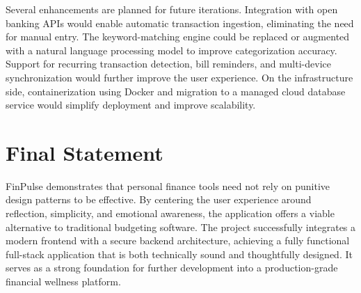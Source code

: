 Several enhancements are planned for future iterations. Integration with open banking APIs would enable automatic transaction ingestion, eliminating the need for manual entry. The keyword-matching engine could be replaced or augmented with a natural language processing model to improve categorization accuracy. Support for recurring transaction detection, bill reminders, and multi-device synchronization would further improve the user experience. On the infrastructure side, containerization using Docker and migration to a managed cloud database service would simplify deployment and improve scalability.

\section{Final Statement}

FinPulse demonstrates that personal finance tools need not rely on punitive design patterns to be effective. By centering the user experience around reflection, simplicity, and emotional awareness, the application offers a viable alternative to traditional budgeting software. The project successfully integrates a modern frontend with a secure backend architecture, achieving a fully functional full-stack application that is both technically sound and thoughtfully designed. It serves as a strong foundation for further development into a production-grade financial wellness platform.
